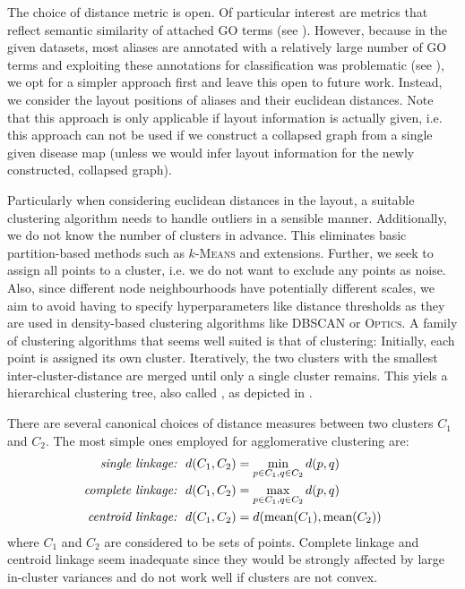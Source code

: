 \documentclass[
	fontsize=10pt, %
	twoside=false, %
	secnumdepth=1, %
  toc=indentunnumbered %
]{kaobook}
\begin{document}
The choice of distance metric is open. Of particular interest are metrics that
reflect semantic similarity of attached GO terms
(see ).
However, because in the given
datasets, most aliases are annotated with a relatively large number of GO terms
and exploiting these annotations for classification was problematic (see ),
we opt for a
simpler approach first and leave this open to future work. %
Instead, we consider the layout positions of aliases and their euclidean
distances. Note that this approach is only applicable if layout information is
actually given, i.e. this approach can not be used if we construct a collapsed
graph from a single given disease map (unless we would infer layout information
for the newly constructed, collapsed graph).

Particularly when considering euclidean distances in the layout, a suitable
clustering algorithm needs to handle outliers in a sensible manner.
Additionally, we do not know the number of clusters in advance. This eliminates
basic partition-based methods such as $k$-\textsc{Means} and extensions.
%
Further, we seek to assign all points to a cluster, i.e. we do not want to
exclude any points as noise. Also, since different node neighbourhoods have
potentially different scales, we aim to avoid having to specify hyperparameters
like distance thresholds as they are used in density-based clustering algorithms
like \textsc{DBSCAN} or \textsc{Optics}.
%
A family of clustering algorithms that seems well suited is that of
 clustering: Initially, each point is assigned its own
cluster. Iteratively, the two clusters with the smallest inter-cluster-distance
are merged until only a single cluster remains. This yiels a hierarchical
clustering tree, also called , as depicted in
.

There are several canonical choices of distance measures between two clusters $C_1$ and
$C_2$. The most simple ones employed for agglomerative clustering are:
\begin{align*}
  \text{{\textit{{single linkage:}}}} &~~ d(C_1, C_2) = \min_{p \in C_1, q \in C_2} d(p,q) \\
  \text{{\textit{{complete linkage:}}}} &~~ d(C_1, C_2) = \max_{p \in C_1, q \in C_2} d(p,q) \\
  \text{{\textit{{centroid linkage:}}}} &~~ d(C_1, C_2) = d(\text{mean}(C_1),\text{mean}(C_2))
\end{align*}
where $C_1$ and $C_2$ are considered to be sets of points. Complete linkage and
centroid linkage seem inadequate since they would be strongly affected by large
in-cluster variances and do not work well if clusters are not convex.
\end{document}
